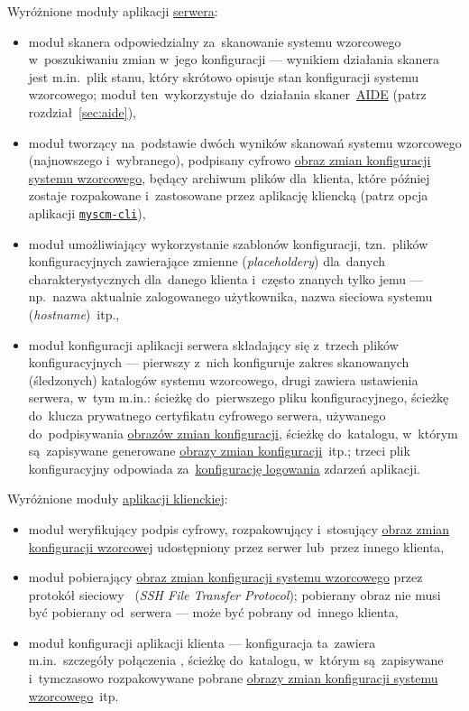 \documentclass[thesis]{subfiles}
\begin{document}
Wyróżnione moduły aplikacji \hyperref[sec:srv-app]{serwera}:\mynobreakpar
\begin{itemize}
	\item moduł skanera odpowiedzialny za~skanowanie systemu wzorcowego w~poszukiwaniu zmian w~jego konfiguracji --- wynikiem działania skanera jest m.in.~plik stanu, który skrótowo opisuje stan konfiguracji systemu wzorcowego; moduł ten~wykorzystuje do~działania skaner~\hyperref[sec:aide]{AIDE} (patrz rozdział~\ref{sec:aide}),
	\item moduł tworzący na~podstawie dwóch wyników skanowań systemu wzorcowego (najnowszego i~wybranego), podpisany cyfrowo \hyperref[sec:obraz-zmian-konfiguracji]{obraz zmian konfiguracji systemu wzorcowego}, będący archiwum plików dla~klienta, które później zostaje rozpakowane i~zastosowane przez aplikację kliencką (patrz opcja  aplikacji \hyperref[sec:cli-app]{\texttt{myscm-cli}}),
	\item moduł umożliwiający wykorzystanie szablonów konfiguracji, tzn.~plików konfiguracyjnych zawierające zmienne (\emph{placeholdery}) dla~danych charakterystycznych dla~danego klienta i~często znanych tylko jemu --- np.~nazwa aktualnie zalogowanego użytkownika, nazwa sieciowa systemu (\emph{hostname})~itp.,
	\item moduł konfiguracji aplikacji serwera składający się z~trzech plików konfiguracyjnych --- pierwszy z~nich konfiguruje zakres skanowanych (śledzonych) katalogów systemu wzorcowego, drugi zawiera ustawienia serwera, w~tym m.in.: ścieżkę do~pierwszego pliku konfiguracyjnego, ścieżkę do~klucza prywatnego certyfikatu cyfrowego serwera, używanego do~podpisywania \hyperref[sec:obraz-zmian-konfiguracji]{obrazów zmian konfiguracji}, ścieżkę do~katalogu, w~którym są~zapisywane generowane \hyperref[sec:obraz-zmian-konfiguracji]{obrazy zmian konfiguracji}~itp.; trzeci plik konfiguracyjny odpowiada za~\href{https://docs.python.org/dev/library/logging.config.html}{konfigurację logowania} zdarzeń aplikacji.
\end{itemize}

Wyróżnione moduły \hyperref[sec:cli-app]{aplikacji klienckiej}:\mynobreakpar
\begin{itemize}
	\item moduł weryfikujący podpis cyfrowy, rozpakowujący i~stosujący \hyperref[sec:obraz-zmian-konfiguracji]{obraz zmian konfiguracji wzorcowej} udostępniony przez serwer lub~przez innego klienta,
	\item moduł pobierający \hyperref[sec:obraz-zmian-konfiguracji]{obraz zmian konfiguracji systemu wzorcowego} przez protokół sieciowy \sftp{}~(\emph{SSH File Transfer Protocol}); pobierany obraz nie musi być pobierany od~serwera --- może być pobrany od~innego klienta,
	\item moduł konfiguracji aplikacji klienta --- konfiguracja ta~zawiera m.in.~szczegóły połączenia \sftp{}, ścieżkę do~katalogu, w~którym są~zapisywane i~tymczasowo rozpakowywane pobrane \hyperref[sec:obraz-zmian-konfiguracji]{obrazy zmian konfiguracji systemu wzorcowego}~itp.
\end{itemize}
\end{document}
